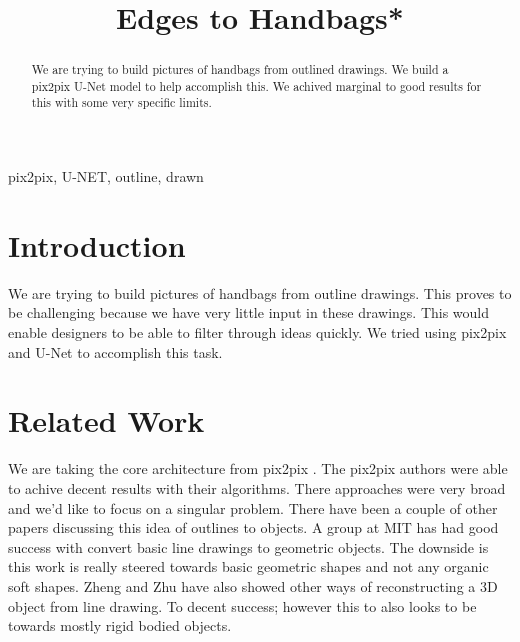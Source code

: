 \documentclass[conference]{IEEEtran}
\begin{document}
\title{Edges to Handbags*}

\author{
\and
{}
}

\maketitle

\begin{abstract}
We are trying to build pictures of handbags from outlined drawings.
We build a pix2pix U-Net model to help accomplish this. We achived
marginal to good results for this with some very specific limits.
\end{abstract}

\begin{IEEEkeywords}
pix2pix, U-NET, outline, drawn
\end{IEEEkeywords}

\section{Introduction}
We are trying to build pictures of handbags from outline drawings. This proves to be
challenging because we have very little input in these drawings. This would enable designers
to be able to filter through ideas quickly. We tried using pix2pix and U-Net to accomplish this task.

\section{Related Work}
We are taking the core architecture from pix2pix \cite{imagetoimage}. The pix2pix
authors were able to achive decent results with their algorithms. There approaches were
very broad and we'd like to focus on a singular problem. There have been a couple of other
papers discussing this idea of outlines to objects. A group at MIT \cite{6247689} has
had good success with convert basic line drawings to geometric objects. The downside
is this work is really steered towards basic geometric shapes and not any organic soft shapes.
Zheng and Zhu have also showed other ways of reconstructing a 3D object from line drawing.
To decent success; however this to also looks to be towards mostly rigid bodied objects.
\end{document}
